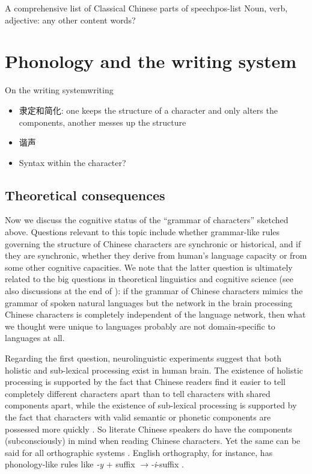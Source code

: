 \documentclass[UTF8, a4paper, oneside, scheme=plain, 12pt]{ctexrep}
\newcommand*{\textto}{$\to$}
\newcommand*{\citesec}[1]{\S~{#1}}
\newcommand*{\citepage}[1]{p.~{#1}}
\newcommand*{\citepages}[1]{pp.~{#1}}
\newcommand{\form}[1]{\emph{#1}}
\begin{document}
\begin{todobox}{A comprehensive list of Classical Chinese parts of speech}{pos-list}
    Noun, verb, adjective: any other content words?
\end{todobox}

\chapter{Phonology and the writing system}

\begin{todobox}{On the writing system}{writing}
    \begin{itemize}
        \item 隶定和简化: one keeps the structure of a character and only alters the components, another messes up the structure
        \item 谐声
        \item Syntax within the character?
    \end{itemize}
\end{todobox}

\section{Theoretical consequences}

Now we discuss the cognitive status of the ``grammar of characters'' sketched above.
Questions relevant to this topic include whether grammar-like rules governing the structure of Chinese characters are synchronic or historical,
and if they are synchronic, whether they derive from human's language capacity or from some other cognitive capacities.
We note that the latter question is ultimately related to the big questions in theoretical linguistics and cognitive science (see also discussions at the end of ):
if the grammar of Chinese characters mimics the grammar of spoken natural languages but the network in the brain processing Chinese characters is completely independent of the language network,
then what we thought were unique to languages probably are not domain-specific to languages at all.

Regarding the first question, neurolinguistic experiments suggest that both holistic and sub-lexical processing exist in human brain.
The existence of holistic processing is supported by the fact that Chinese readers find it easier to tell completely different characters apart than to tell characters with shared components apart,
while the existence of sub-lexical processing is supported by the fact that characters with valid semantic or phonetic components are possessed more quickly
\citep[\citesec{2.2}]{duan2024chinese}.
So literate Chinese speakers do have the components (subconsciously) in mind when reading Chinese characters.
Yet the same can be said for all orthographic systems \citep[\citepages{23-25}]{myers2019grammar}.
English orthography, for instance, has phonology-like rules like \form{-y} + suffix \textto \form{-i}-suffix \citep[\citepage{26}]{myers2019grammar}.
\end{document}
